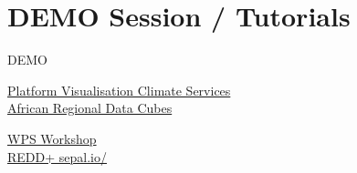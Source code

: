 \documentclass{bredelebeamer}
\begin{document}
\section{DEMO Session / Tutorials}

\begin{frame}{ DEMO }

\href{https://pavics.ouranos.ca/}{Platform Visualisation Climate Services}\\
\vspace{1cm}
\href{http://13.59.149.225/}{African Regional Data Cubes}\\ 
\vspace{1cm}

\href{http://birdhouse-workshop.readthedocs.io/en/latest/}{WPS 
Workshop}\\
\vspace{1cm}
\href{https://sepal.io/}{REDD+ sepal.io/}
\end{frame}
\end{document}
